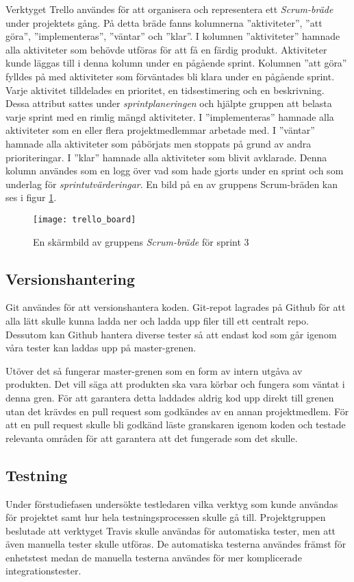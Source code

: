 Verktyget Trello användes för att organisera och representera ett \textit{Scrum-bräde} under projektets gång. På detta bräde fanns kolumnerna ''aktiviteter'', ''att göra'', ''implementeras'', ''väntar'' och ''klar''. I kolumnen ''aktiviteter'' hamnade alla aktiviteter som behövde utföras för att få en färdig produkt. Aktiviteter kunde läggas till i denna kolumn under en pågående sprint. Kolumnen ''att göra'' fylldes på med aktiviteter som förväntades bli klara under en pågående sprint. Varje aktivitet tilldelades en prioritet, en tidsestimering och en beskrivning. Dessa attribut sattes under \textit{sprintplaneringen} och hjälpte gruppen att belasta varje sprint med en rimlig mängd aktiviteter. I ''implementeras'' hamnade alla aktiviteter som en eller flera projektmedlemmar arbetade med. I ''väntar'' hamnade alla aktiviteter som påbörjats men stoppats på grund av andra prioriteringar. I ''klar'' hamnade alla aktiviteter som blivit avklarade. Denna kolumn användes som en logg över vad som hade gjorts under en sprint och som underlag för \textit{sprintutvärderingar}. En bild på en av gruppens Scrum-bräden kan ses i figur \ref{fig:trello_board}.

\begin{figure}[h]
    \centering
    \texttt{[image: trello\_board]}
    \caption{En skärmbild av gruppens \textit{Scrum-bräde} för sprint 3}
    \label{fig:trello_board}
\end{figure}

\subsection{Versionshantering}
Git användes för att versionshantera koden. Git-repot lagrades på Github för att alla lätt skulle kunna ladda ner och ladda upp filer till ett centralt repo. Dessutom kan Github hantera diverse tester så att endast kod som går igenom våra tester kan laddas upp på master-grenen.

Utöver det så fungerar master-grenen som en form av intern utgåva av produkten. Det vill säga att produkten ska vara körbar och fungera som väntat i denna gren. För att garantera detta laddades aldrig kod upp direkt till grenen utan det krävdes en pull request som godkändes av en annan projektmedlem. För att en pull request skulle bli godkänd läste granskaren igenom koden och testade relevanta områden för att garantera att det fungerade som det skulle.

\subsection{Testning}
Under förstudiefasen undersökte testledaren vilka verktyg som kunde användas för projektet samt hur hela testningsprocessen skulle gå till. Projektgruppen beslutade att verktyget Travis skulle användas för automatiska tester, men att även manuella tester skulle utföras. De automatiska testerna användes främst för enhetstest medan de manuella testerna användes för mer komplicerade integrationstester.

